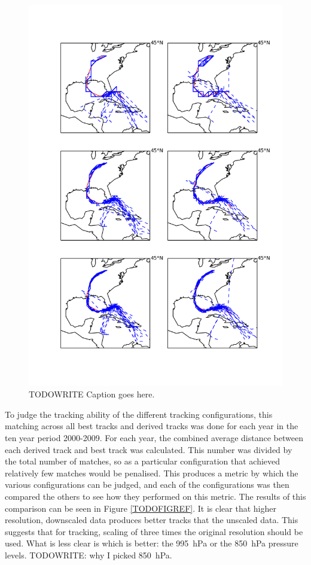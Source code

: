 \documentclass[pdftex,12pt,a4paper]{report}
\begin{document}
\begin{figure}[hbp]
    \centering
    \includegraphics[width=\linewidth]{figures/katrina_six_tracking_configs}
    \caption{TODOWRITE Caption goes here.}
    \label{fig:katrina_six_tracking_configs}
\end{figure}

To judge the tracking ability of the different tracking configurations, this matching across all
best tracks and derived tracks was done for each year in the ten year period 2000-2009.
For each year, the combined average distance between each derived track and best track was
calculated. This number was divided by the total number of matches, so as a particular configuration
that achieved relatively few matches would be penalised. This produces a metric by which the various
configurations can be judged, and each of the configurations was then compared the others to see how
they performed on this metric. The results of this comparison can be seen in Figure
\ref{TODOFIGREF}. It is clear that higher resolution, downscaled data produces better tracks that
the unscaled data. This suggests that for tracking, scaling of three times the original resolution
should be used. What is less clear is which is better: the \SI{995}{hPa} or the \SI{850}{hPa}
pressure levels. TODOWRITE: why I picked \SI{850}{hPa}.
\end{document}

